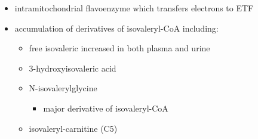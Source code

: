 \documentclass[12pt]{scrartcl}
\begin{document}
\begin{enumerate}

\begin{itemize}
\item intramitochondrial flavoenzyme which transfers electrons to ETF
\end{itemize}
\begin{itemize}
\item accumulation of derivatives of isovaleryl-CoA including:
\begin{itemize}
\item free isovaleric increased in both plasma and urine
\item 3-hydroxyisovaleric acid
\item N-isovalerylglycine
\begin{itemize}
\item major derivative of isovaleryl-CoA
\end{itemize}
\item isovaleryl-carnitine (C5)
\end{itemize}
\end{itemize}


\end{enumerate}
\end{document}
